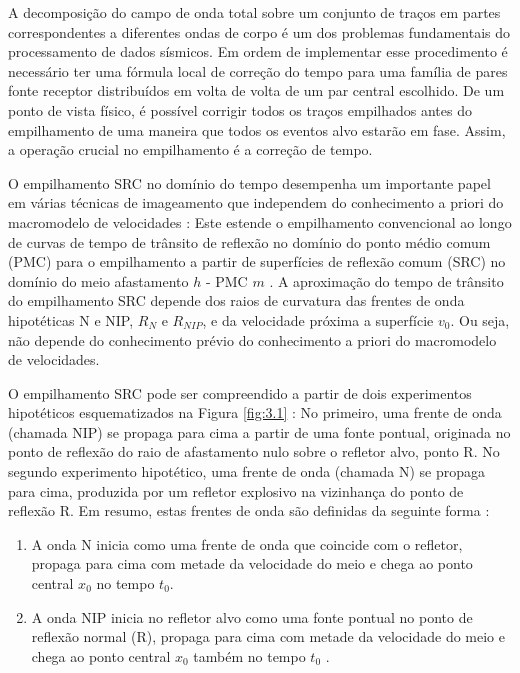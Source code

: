 A decomposição do campo de onda total sobre um conjunto de traços em partes correspondentes a diferentes ondas
de corpo é um dos problemas fundamentais do processamento de dados sísmicos. 
Em ordem de implementar esse procedimento é necessário
ter uma fórmula local de correção do tempo para uma família de pares fonte receptor distribuídos em volta de volta
de um par central escolhido.\cite{gelpart1}
De um ponto de vista físico, é possível corrigir todos os traços empilhados antes do empilhamento de uma maneira
que todos os eventos alvo estarão em fase. Assim, a operação crucial no empilhamento é a correção de tempo.\cite{gelpart1}

O empilhamento SRC no domínio do tempo desempenha um importante papel em várias técnicas de imageamento que independem do
conhecimento a priori do macromodelo de velocidades
\cite{peterhubral}:
Este estende o empilhamento convencional
ao longo de curvas de tempo de trânsito de reflexão no domínio do ponto médio comum (PMC) para
o empilhamento a partir de superfícies de reflexão comum (SRC) no domínio do meio afastamento $h$ - PMC $m$ \cite{fomel1}.
A aproximação do tempo de trânsito do empilhamento SRC depende dos raios de curvatura das frentes de onda
hipotéticas N e NIP, $R_N$ e $R_{NIP}$, e da velocidade próxima a superfície $v_0$. Ou seja, não depende
do conhecimento prévio do conhecimento a priori do macromodelo de velocidades.

O empilhamento SRC pode
ser compreendido a partir de dois experimentos hipotéticos esquematizados na Figura \ref{fig:3.1} \cite{gelpart1}: 
No primeiro, uma frente de onda (chamada NIP) se propaga para cima a partir de uma fonte pontual, 
originada no ponto de
reflexão do raio de afastamento nulo sobre o refletor alvo, ponto R. 
No segundo experimento hipotético, uma frente de onda (chamada N) se propaga para cima, produzida por um refletor explosivo na
vizinhança do ponto de reflexão R.
Em resumo, estas frentes de onda são definidas da seguinte forma \cite{tygel}: 

\begin{enumerate}
 \item A onda N inicia como uma frente de onda que coincide com o refletor, 
 propaga para cima com metade da velocidade do meio e chega ao ponto central $x_0$ no tempo $t_0$.

\item A onda NIP inicia no refletor alvo como uma fonte pontual no ponto de reflexão normal (R), propaga para
cima com metade da velocidade do meio e chega ao ponto central $x_0$ também no tempo $t_0$ .
\end{enumerate}


